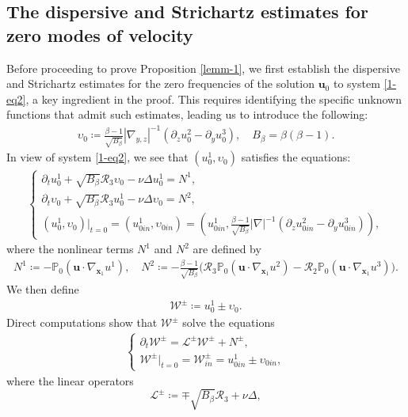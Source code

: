 \documentclass[11pt,reqno]{article}
\numberwithin{equation}{section}
\newcommand\PP{{\mathbb P}}
\newcommand\W{{\mathcal W}}
\newcommand\x{\bm{x}}
\newcommand\up{\upsilon}
\newcommand\uu{\bm{u}}
\newcommand \tri {\coloneqq}
\let\pa=\partial
\let\f=\frac
\def \pt {\partial_t}
\begin{document}
\subsection{The dispersive and Strichartz estimates for zero modes of velocity} \label{sec-zeromode-1}
Before proceeding to prove Proposition \ref{lemm-1}, we first establish the dispersive and Strichartz estimates for the zero frequencies of the solution $\uu_0$ to system \eqref{1-eq2}, a key ingredient in the proof.
This requires identifying the specific unknown functions that admit such estimates, leading us to introduce the following:
\begin{align}\label{def-cu}
\up_0
\tri \f{\beta-1}{\sqrt{B_{\beta}}} |\nabla_{y,z}|^{-1} (\pa_z u_0^2-\pa_y u_0^3),\quad B_{\beta}=\beta(\beta-1).
\end{align}
In view of system \eqref{1-eq2}, we see that $(u_{0}^1, \up_0)$ satisfies the equations: 
\begin{align*}
\left\{\begin{array}{l}
	\pt u_0^1+\sqrt{B_\beta}\mathcal{R}_3 \up_0-\nu\Delta u_0^1
	=N^1, 
	\\[1ex]
	\pt \up_0+\sqrt{B_\beta}\mathcal{R}_3u_0^1-\nu\Delta  \up_0
	=N^2,
	\\[1ex]
	(u_0^1,\up_0)|_{t=0}=(u_{0in}^1,\up_{0in})=(u_{0in}^1,\f{\beta-1}{\sqrt{B_{\beta}}} |\nabla|^{-1} (\pa_z u_{0in}^2-\pa_y u_{0in}^3)),
\end{array}\right.
\end{align*}
where the nonlinear terms $N^1$ and $N^2$ are defined by
\begin{align*}%
N^1 \tri -\PP_0(\uu\cdot\nabla_{\x_1}  u^1),
\quad
N^2 \tri -\f{\beta-1}{\sqrt{B_{\beta}}}\big(\mathcal{R}_3\PP_0(\uu\cdot\nabla_{\x_1}  u^2) -\mathcal{R}_2\PP_0(\uu\cdot\nabla_{\x_1}  u^3)\big).
\end{align*}
We then define 
\begin{align}\label{def-W-1}
\W^{\pm}
\tri u_0^1 \pm  \up_0.
\end{align}
Direct computations show that $\W^{\pm}$ solve the equations
\begin{align*}
\left\{\begin{array}{l}
	\pt \W^{\pm}= 
	\mathcal{L}^{\pm}
	\W^{\pm}+N^{\pm},
	\\[1ex]
	\W^{\pm}|_{t=0}=\W^{\pm}_ {in}= u_{0in}^1 \pm \upsilon_{0in},
\end{array}\right.
\end{align*}
where the linear operators %
$$\mathcal{L}^{\pm}\tri \mp \sqrt{B_{\beta}} \mathcal{R}_3+\nu\Delta ,$$
\end{document}
